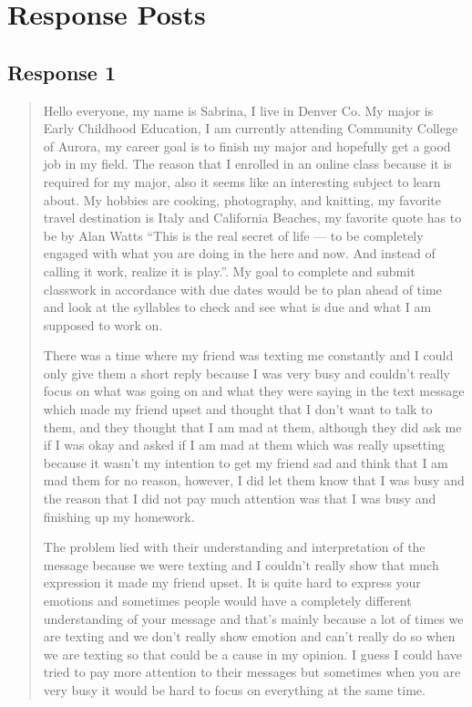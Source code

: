 
\section{Response Posts}
  \subsection{Response 1}
    \begin{quotation}
      Hello everyone, my name is Sabrina, I live in Denver Co. My major is Early
        Childhood Education, I am currently attending Community College of
        Aurora, my career goal is to finish my major and hopefully get a good
        job in my field. The reason that I enrolled in an online class because
        it is required for my major, also it seems like an interesting subject
        to learn about. My hobbies are cooking, photography, and knitting, my
        favorite travel destination is Italy and California Beaches, my
        favorite quote has to be by Alan Watts “This is the real secret of life
        --- to be completely engaged with what you are doing in the here and
        now. And instead of calling it work, realize it is play.”. My goal to
        complete and submit classwork in accordance with due dates would be to
        plan ahead of time and look at the syllables to check and see what is
        due and what I am supposed to work on.

      There was a time where my friend was texting me constantly and I could
        only give them a short reply because I was very busy and couldn’t really
        focus on what was going on and what they were saying in the text message
        which made my friend upset and thought that I don’t want to talk to
        them, and they thought that I am mad at them, although they did ask me
        if I was okay and asked if I am mad at them which was really upsetting
        because it wasn’t my intention to get my friend sad and think that I am
        mad them for no reason, however, I did let them know that I was busy and
        the reason that I did not pay much attention was that I was busy and
        finishing up my homework.

      The problem lied with their understanding and interpretation of the
        message because we were texting and I couldn’t really show that much
        expression it made my friend upset. It is quite hard to express your
        emotions and sometimes people would have a completely different
        understanding of your message and that’s mainly because a lot of times
        we are texting and we don’t really show emotion and can’t really do so
        when we are texting so that could be a cause in my opinion. I guess I
        could have tried to pay more attention to their messages but sometimes
        when you are very busy it would be hard to focus on everything at the
        same time.
    \end{quotation}

